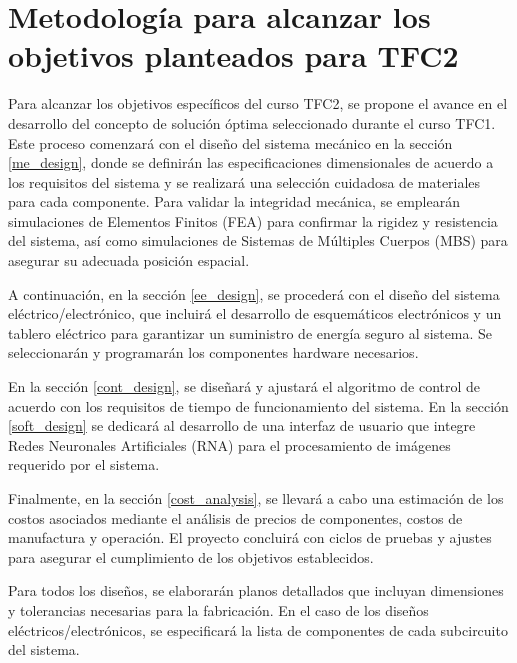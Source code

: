 \section*{Metodología para alcanzar los objetivos planteados para TFC2}

Para alcanzar los objetivos específicos del curso TFC2, se propone el avance en el desarrollo del concepto de solución óptima seleccionado durante el curso TFC1. Este proceso comenzará con el diseño del sistema mecánico en la sección \ref{me_design}, donde se definirán las especificaciones dimensionales de acuerdo a los requisitos del sistema y se realizará una selección cuidadosa de materiales para cada componente. Para validar la integridad mecánica, se emplearán simulaciones de Elementos Finitos (FEA) para confirmar la rigidez y resistencia del sistema, así como simulaciones de Sistemas de Múltiples Cuerpos (MBS) para asegurar su adecuada posición espacial.

A continuación, en la sección \ref{ee_design}, se procederá con el diseño del sistema eléctrico/electrónico, que incluirá el desarrollo de esquemáticos electrónicos y un tablero eléctrico para garantizar un suministro de energía seguro al sistema. Se seleccionarán y programarán los componentes hardware necesarios.

En la sección \ref{cont_design}, se diseñará y ajustará el algoritmo de control de acuerdo con los requisitos de tiempo de funcionamiento del sistema. En la sección \ref{soft_design} se dedicará al desarrollo de una interfaz de usuario que integre Redes Neuronales Artificiales (RNA) para el procesamiento de imágenes requerido por el sistema.

Finalmente, en la sección \ref{cost_analysis}, se llevará a cabo una estimación de los costos asociados mediante el análisis de precios de componentes, costos de manufactura y operación. El proyecto concluirá con ciclos de pruebas y ajustes para asegurar el cumplimiento de los objetivos establecidos.

Para todos los diseños, se elaborarán planos detallados que incluyan dimensiones y tolerancias necesarias para la fabricación. En el caso de los diseños eléctricos/electrónicos, se especificará la lista de componentes de cada subcircuito del sistema.
